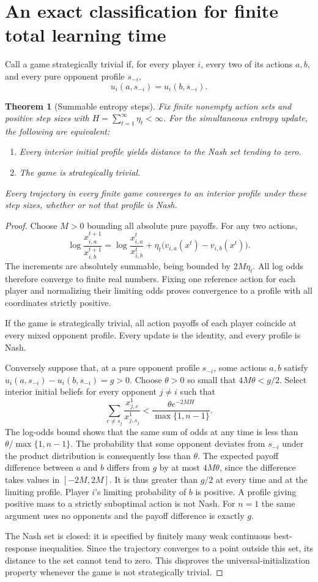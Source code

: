 \documentclass[11pt]{article}
\newtheorem{theorem}{Theorem}
\theoremstyle{definition}
\begin{document}
\section*{An exact classification for finite total learning time}
Call a game strategically trivial if, for every player $i$, every two of its actions $a,b$, and every pure opponent profile $s_{-i}$,
\[
 u_i(a,s_{-i})=u_i(b,s_{-i}).
\]
\begin{theorem}[Summable entropy steps]
Fix finite nonempty action sets and positive step sizes with $H=\sum_{t=1}^{\infty}\eta_t<\infty$. For the simultaneous entropy update, the following are equivalent:
\begin{enumerate}
\item Every interior initial profile yields distance to the Nash set tending to zero.
\item The game is strategically trivial.
\end{enumerate}
Every trajectory in every finite game converges to an interior profile under these step sizes, whether or not that profile is Nash.
\end{theorem}
\begin{proof}
Choose $M>0$ bounding all absolute pure payoffs. For any two actions,
\[
 \log\frac{x_{i,a}^{t+1}}{x_{i,b}^{t+1}}
 =\log\frac{x_{i,a}^{t}}{x_{i,b}^{t}}
 +\eta_t\bigl(v_{i,a}(x^t)-v_{i,b}(x^t)\bigr).
\]
The increments are absolutely summable, being bounded by $2M\eta_t$. All log odds therefore converge to finite real numbers. Fixing one reference action for each player and normalizing their limiting odds proves convergence to a profile with all coordinates strictly positive.

If the game is strategically trivial, all action payoffs of each player coincide at every mixed opponent profile. Every update is the identity, and every profile is Nash.

Conversely suppose that, at a pure opponent profile $s_{-i}$, some actions $a,b$ satisfy $u_i(a,s_{-i})-u_i(b,s_{-i})=g>0$. Choose $\theta>0$ so small that $4M\theta<g/2$. Select interior initial beliefs for every opponent $j\ne i$ such that
\[
 \sum_{c\ne s_j}\frac{x_{j,c}^1}{x_{j,s_j}^1}
 <\frac{\theta e^{-2MH}}{\max\{1,n-1\}}.
\]
The log-odds bound shows that the same sum of odds at any time is less than $\theta/\max\{1,n-1\}$. The probability that some opponent deviates from $s_{-i}$ under the product distribution is consequently less than $\theta$. The expected payoff difference between $a$ and $b$ differs from $g$ by at most $4M\theta$, since the difference takes values in $[-2M,2M]$. It is thus greater than $g/2$ at every time and at the limiting profile. Player $i$'s limiting probability of $b$ is positive. A profile giving positive mass to a strictly suboptimal action is not Nash. For $n=1$ the same argument uses no opponents and the payoff difference is exactly $g$.

The Nash set is closed: it is specified by finitely many weak continuous best-response inequalities. Since the trajectory converges to a point outside this set, its distance to the set cannot tend to zero. This disproves the universal-initialization property whenever the game is not strategically trivial.
\end{proof}
\end{document}
